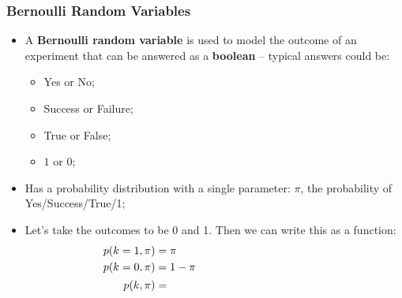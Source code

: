 \documentclass[aspectratio=169]{beamer}
\theoremstyle{principle}
\begin{document}
\begin{frame}
\frametitle{Bernoulli Random Variables}

\begin{itemize}
\item A \textbf{Bernoulli random variable} is used to model the outcome of an experiment that can be answered as a \textbf{boolean} -- typical answers could be:
\begin{itemize}
\item  Yes or No;
\item Success or Failure;
\item True or False;
\item $1$ or $0$;
\end{itemize}
\bigskip

\item Has a probability distribution with a single parameter: $\pi$, the probability of Yes/Success/True/1;
\bigskip

\item Let's take the outcomes to be 0 and 1.  Then we can write this as a function:
\begin{align*}
p(k = 1,\pi) &= \pi\\
p(k = 0,\pi) &= 1 - \pi\\
p(k,\pi) &=\color{white} \pi^k(1-\pi)^{1-k} \mbox{ for }k = 0\mbox{ or }k = 1.
\end{align*}

\end{itemize}

\end{frame}
\end{document}
